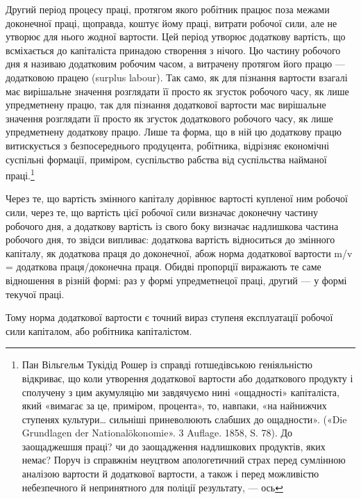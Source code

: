 Другий період процесу праці, протягом якого робітник працює поза межами доконечної праці, щоправда,
коштує йому
праці, витрати робочої сили, але не утворює для нього жодної вартости. Цей період утворює додаткову
вартість, що всміхається до капіталіста принадою створення з нічого. Цю частину робочого
дня я називаю додатковим робочим часом, а витрачену протягом його працю — додатковою працею (surplus
labour). Так само, як для пізнання вартости взагалі має вирішальне значення розглядати її просто як
згусток робочого часу, як лише упредметнену працю, так для пізнання додаткової вартости має
вирішальне
значення розглядати її просто як згусток додаткового робочого часу, як лише упредметнену додаткову
працю. Лише та форма, що в ній цю додаткову працю витискується з безпосереднього продуцента,
робітника, відрізняє економічні суспільні формації, приміром, суспільство рабства від суспільства
найманої праці.\footnote{
Пан Вільгельм Тукідід Рошер із справді ґотшедівською геніяльністю відкриває, що коли утворення
додаткової вартости або додаткового продукту і сполучену з цим акумуляцію ми завдячуємо нині
«ощадності» капіталіста, який «вимагає за це, приміром, процента», то, навпаки, «на
найнижчих ступенях культури\dots{} сильніші приневолюють слабших до ощадности». («Die Grundlagen der
Nationalökonomie». 3 Auflage. 1858, S. 78). До заощаджешшя праці? чи до заощадження надлишкових
продуктів, яких немає? Поруч із справжнім неуцтвом апологетичний страх перед сумлінною аналізою
вартости й додаткової вартости, а також і перед можливістю небезпечного й непринятного для поліції
результату, — ось
}

Через те, що вартість змінного капіталу дорівнює вартості купленої ним робочої сили, через те, що
вартість цієї робочої
сили визначає доконечну частину робочого дня, а додаткову вартість із свого боку визначає надлишкова
частина робочого дня, то звідси випливає: додаткова вартість відноситься до змінного капіталу, як
додаткова праця до доконечної, абож норма додаткової вартости m/v = додаткова праця/доконечна праця.
Обидві пропорції виражають те саме відношення в різній формі: раз у формі упредметнецої
праці, другий — у формі текучої праці.

Тому норма додаткової вартости є точний вираз ступеня експлуатації робочої сили капіталом, або
робітника капіталістом.

